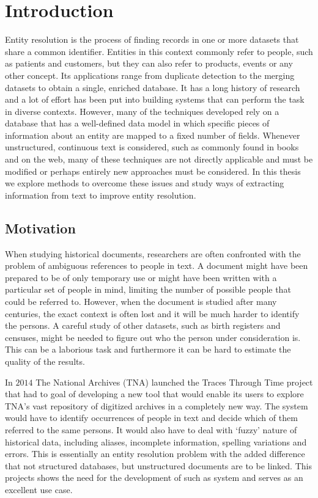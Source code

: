 \section{Introduction}
\label{sec:introduction}

Entity resolution is the process of finding records in one or more datasets that share a common identifier.
Entities in this context commonly refer to people, such as patients and customers, but they can also refer to products, events or any other concept.
Its applications range from duplicate detection to the merging datasets to obtain a single, enriched database. It has a long history of research and a lot of effort has been put into building systems that can perform the task in diverse contexts.
However, many of the techniques developed rely on a database that has a well-defined data model in which specific pieces of information about an entity are mapped to a fixed number of fields.
Whenever unstructured, continuous text is considered, such as commonly found in books and on the web, many of these techniques are not directly applicable and must be modified or perhaps entirely new approaches must be considered.
In this thesis we explore methods to overcome these issues and study ways of extracting information from text to improve entity resolution.




\subsection{Motivation}
\label{sec:motivation}

When studying historical documents, researchers are often confronted with the problem of ambiguous references to people in text.
A document might have been prepared to be of only temporary use or might have been written with a particular set of people in mind, limiting the number of possible people that could be referred to.
However, when the document is studied after many centuries, the exact context is often lost and it will be much harder to identify the persons.
A careful study of other datasets, such as birth registers and censuses, might be needed to figure out who the person under consideration is.
This can be a laborious task and furthermore it can be hard to estimate the quality of the results.

In $2014$ The National Archives (TNA) launched the Traces Through Time project that had to goal of developing a new tool that would enable its users to explore TNA's vast repository of digitized archives in a completely new way.
The system would have to identify occurrences of people in text and decide which of them referred to the same persons.
It would also have to deal with `fuzzy' nature of historical data, including aliases, incomplete information, spelling variations and errors.
This is essentially an entity resolution problem with the added difference that not structured databases, but unstructured documents are to be linked.
This projects shows the need for the development of such as system and serves as an excellent use case.

